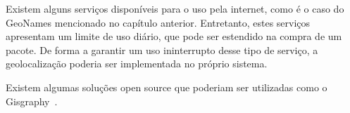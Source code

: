 	Existem alguns serviços disponíveis para o uso pela internet, como é o caso do GeoNames mencionado no capítulo anterior. Entretanto, estes serviços apresentam um limite de uso diário, que pode ser estendido na compra de um pacote. De forma a garantir um uso ininterrupto desse tipo de serviço, a geolocalização poderia ser implementada no próprio sistema.

	Existem algumas soluções open source que poderiam ser utilizadas como o Gisgraphy~\cite{gisgraphy}.










